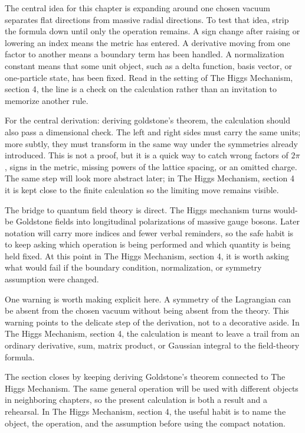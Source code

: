 The central idea for this chapter is expanding around one chosen vacuum separates flat directions from massive radial directions.  To test that idea, strip the formula down until only the operation remains.  A sign change after raising or lowering an index means the metric has entered.  A derivative moving from one factor to another means a boundary term has been handled.  A normalization constant means that some unit object, such as a delta function, basis vector, or one-particle state, has been fixed.  Read in the setting of The Higgs Mechanism, section 4, the line is a check on the calculation rather than an invitation to memorize another rule.

For the central derivation: deriving goldstone's theorem, the calculation should also pass a dimensional check.  The left and right sides must carry the same units; more subtly, they must transform in the same way under the symmetries already introduced.  This is not a proof, but it is a quick way to catch wrong factors of \(2\pi\), signs in the metric, missing powers of the lattice spacing, or an omitted charge.  The same step will look more abstract later; in The Higgs Mechanism, section 4 it is kept close to the finite calculation so the limiting move remains visible.

The bridge to quantum field theory is direct.  The Higgs mechanism turns would-be Goldstone fields into longitudinal polarizations of massive gauge bosons.  Later notation will carry more indices and fewer verbal reminders, so the safe habit is to keep asking which operation is being performed and which quantity is being held fixed.  At this point in The Higgs Mechanism, section 4, it is worth asking what would fail if the boundary condition, normalization, or symmetry assumption were changed.

One warning is worth making explicit here.  A symmetry of the Lagrangian can be absent from the chosen vacuum without being absent from the theory.  This warning points to the delicate step of the derivation, not to a decorative aside.  In The Higgs Mechanism, section 4, the calculation is meant to leave a trail from an ordinary derivative, sum, matrix product, or Gaussian integral to the field-theory formula.

The section closes by keeping deriving Goldstone's theorem connected to The Higgs Mechanism.  The same general operation will be used with different objects in neighboring chapters, so the present calculation is both a result and a rehearsal.  In The Higgs Mechanism, section 4, the useful habit is to name the object, the operation, and the assumption before using the compact notation.



